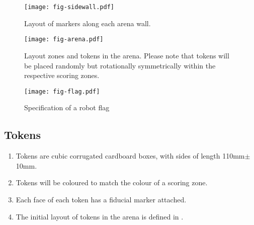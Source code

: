 \begin{sidewaysfigure}
  \texttt{[image: fig-sidewall.pdf]}
  \caption{Layout of markers along each arena wall.}
  \label{fig:sidewall}
\end{sidewaysfigure}

\begin{figure}
  \texttt{[image: fig-arena.pdf]}
  \caption{Layout zones and tokens in the arena. Please note that tokens will
  be placed randomly but rotationally symmetrically within the respective
  scoring zones.}
  \label{fig:arena}
\end{figure}

\begin{figure}
  \texttt{[image: fig-flag.pdf]}
  \caption{Specification of a robot flag}
  \label{fig:flag}
\end{figure}
\subsection{Tokens}
\label{spec:tokens}

\begin{enumerate}
  \item Tokens are cubic corrugated cardboard boxes, with sides of length
        \si{110}{mm}$\pm$\si{10}{mm}.
  \item Tokens will be coloured to match the colour of a scoring zone.
  \item Each face of each token has a fiducial marker attached.
  \item The initial layout of tokens in the arena is defined in
        .
\end{enumerate}
